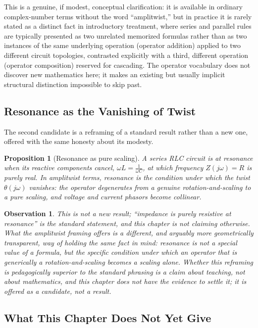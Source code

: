\documentclass[12pt]{article}
\newtheorem{proposition}{Proposition}
\newtheorem{observation}{Observation}
\begin{document}
This is a genuine, if modest, conceptual clarification: it is available in ordinary complex-number terms without the word ``amplitwist,'' but in practice it is rarely stated as a distinct fact in introductory treatment, where series and parallel rules are typically presented as two unrelated memorized formulas rather than as two instances of the same underlying operation (operator addition) applied to two different circuit topologies, contrasted explicitly with a third, different operation (operator composition) reserved for cascading. The operator vocabulary does not discover new mathematics here; it makes an existing but usually implicit structural distinction impossible to skip past.

\subsection{Resonance as the Vanishing of Twist}

The second candidate is a reframing of a standard result rather than a new one, offered with the same honesty about its modesty.

\begin{proposition}[Resonance as pure scaling]
A series RLC circuit is at resonance when its reactive components cancel, $\omega L = \frac{1}{\omega C}$, at which frequency $Z(j\omega) = R$ is purely real. In amplitwist terms, resonance is the condition under which the twist $\theta(j\omega)$ vanishes: the operator degenerates from a genuine rotation-and-scaling to a pure scaling, and voltage and current phasors become collinear.
\end{proposition}

\begin{observation}
This is not a new result; ``impedance is purely resistive at resonance'' is the standard statement, and this chapter is not claiming otherwise. What the amplitwist framing offers is a different, and arguably more geometrically transparent, way of holding the same fact in mind: resonance is not a special value of a formula, but the specific condition under which an operator that is generically a rotation-and-scaling becomes a scaling alone. Whether this reframing is pedagogically superior to the standard phrasing is a claim about teaching, not about mathematics, and this chapter does not have the evidence to settle it; it is offered as a candidate, not a result.
\end{observation}

\subsection{What This Chapter Does Not Yet Give}
\end{document}
